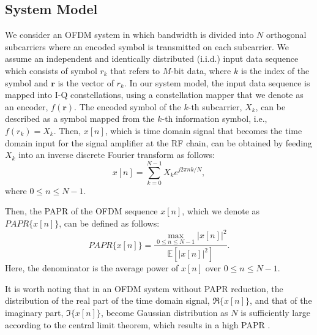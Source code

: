 \documentclass[journal]{IEEEtran}
\begin{document}
\subsection{System Model}
We consider an OFDM system in which bandwidth is divided into $N$ orthogonal subcarriers where an encoded symbol is transmitted on each subcarrier. We assume an independent and identically distributed (i.i.d.) input data sequence which consists of symbol $r_k$ that refers to $M$-bit data, where $k$ is the index of the symbol and $\boldsymbol{r}$ is the vector of $r_k$. In our system model, the input data sequence is mapped into I-Q constellations, using a constellation mapper that we denote as an encoder, $f(\boldsymbol{r})$. The encoded symbol of the $k$-th subcarrier, $X_k$, can be described as a symbol mapped from the $k$-th information symbol, i.e., $f(r_k) = X_k$. Then, $x[n]$, which is time domain signal that becomes the time domain input for the signal amplifier at the RF chain, can be obtained by feeding $X_k$ into an inverse discrete Fourier transform as follows:
\begin{equation}
x[n] = \sum_{k=0}^{N-1} X_k e^{j2\pi nk/N} ,
\label{eq1}
\end{equation}
where $0 \le n \le N - 1$.

Then, the PAPR of the OFDM sequence $x[n]$, which we denote as $PAPR\{x[n]\}$, can be defined as follows:
\begin{equation}
PAPR\{x[n]\} = \frac{\max_{0 \le n \le N-1} |x[n]|^2}{\mathbb{E}[|x[n]|^2]} .
\label{eq2}
\end{equation}
Here, the denominator is the average power of $x[n]$ over $0 \le n \le N - 1$.

It is worth noting that in an OFDM system without PAPR reduction, the distribution of the real part of the time domain signal, $\Re\{x[n]\}$, and that of the imaginary part, $\Im\{x[n]\}$, become Gaussian distribution as $N$ is sufficiently large according to the central limit theorem, which results in a high PAPR \cite{b11}.
\end{document}
